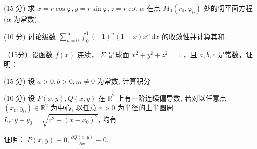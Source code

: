 \par{}
(15 分) 求 $x = r \cos \varphi, y = r \sin \varphi, z = r \cot \alpha$ 在点 $M_0(r_0, \varphi_0)$ 处的切平面方程 ($\alpha$ 为常数).\par
\par{}
(10 分) 讨论级数 $\sum_{n=0}^{\infty} \int_{0}^{1} (-1)^{n}(1 - x)x^{n} \, \mathrm{d}x$ 的收敛性并计算其和.\par
\par{}
\par{}
（15分）设函数 $f(x)$ 连续， $\Sigma$ 是球面 $x^{2} + y^{2} + z^{2} = 1$ ，且 $a,b,c$ 是常数，证明：\par
\nopagebreak[4]
\par{}
\par{}
(15 分) 设 $a > 0, b > 0, m \neq 0$ 为常数, 计算积分\par
\nopagebreak[4]
\par{}
\par{}
(10 分) 设 $P(x, y), Q(x, y)$ 在 $\mathbb{R}^2$ 上有一阶连续偏导数, 若对以任意点 $(x_0, y_0) \in \mathbb{R}^2$ 为中心, 以任意 $r > 0$ 为半径的上半圆周 $L_r: y - y_0 = \sqrt{r^2 - (x - x_0)^2}$, 均有\par
\nopagebreak[4]
证明： $P(x,y)\equiv 0,\frac{\partial Q(x,y)}{\partial x}\equiv 0.$\par

